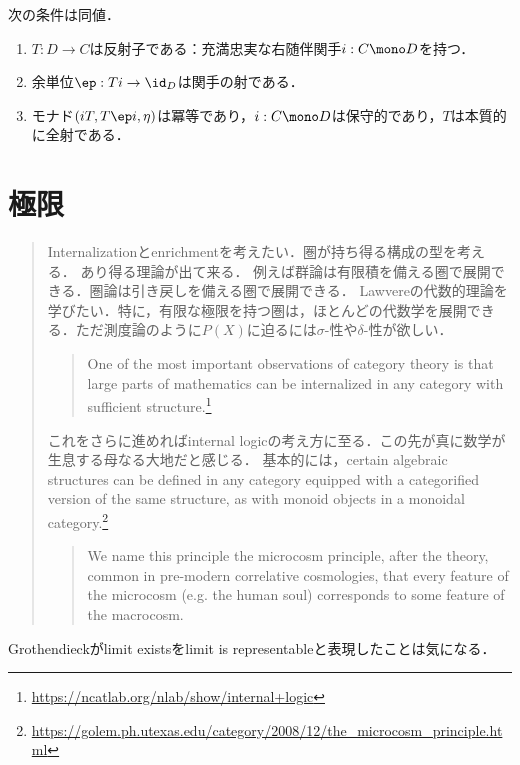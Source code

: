 \documentclass[uplatex,dvipdfmx]{jsreport}
\begin{document}
\begin{lemma}[反射子の特徴付け]\label{lemma-characterization-of-reflector}
    次の条件は同値．
    \begin{enumerate}
        \item $T:D\to C$は反射子である：充満忠実な右随伴関手$i:C\mono D$を持つ．
        \item 余単位$\ep:Ti\to \id_D$は関手の射である．
        \item モナド$(iT,T\ep i,\eta)$は冪等であり，$i:C\mono D$は保守的であり，$T$は本質的に全射である．
    \end{enumerate}
\end{lemma}

\chapter{極限}

\begin{quotation}
    Internalizationとenrichmentを考えたい．圏が持ち得る構成の型を考える．
    あり得る理論が出て来る．
    例えば群論は有限積を備える圏で展開できる．圏論は引き戻しを備える圏で展開できる．
    Lawvereの代数的理論を学びたい．特に，有限な極限を持つ圏は，ほとんどの代数学を展開できる．ただ測度論のように$P(X)$に迫るには$\sigma$-性や$\delta$-性が欲しい．
    \begin{quote}
        One of the most important observations of category theory is that large parts of mathematics can be internalized in any category with sufficient structure.\footnote{\url{https://ncatlab.org/nlab/show/internal+logic}}
    \end{quote}
    これをさらに進めればinternal logicの考え方に至る．この先が真に数学が生息する母なる大地だと感じる．
    基本的には，certain algebraic structures can be defined in any category equipped with a categorified version of the same structure, as with monoid objects in a monoidal category.\footnote{\url{https://golem.ph.utexas.edu/category/2008/12/the_microcosm_principle.html}}
    \begin{quote}
        We name this principle the microcosm principle, after the theory, common in pre-modern correlative cosmologies, that every feature of the microcosm (e.g. the human soul) corresponds to some feature of the macrocosm.\cite{John and James}
    \end{quote}
\end{quotation}

\begin{tcolorbox}[colframe=ForestGreen, colback=ForestGreen!10!white, breakable ,colbacktitle=ForestGreen!40!white, coltitle=black,fonttitle=\bfseries\sffamily,
    title=]
    Grothendieckがlimit existsをlimit is representableと表現したことは気になる．
\end{tcolorbox}
\end{document}
